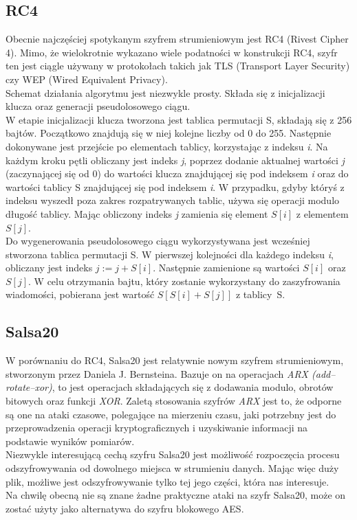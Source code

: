 \subsection{RC4}
Obecnie najczęściej spotykanym szyfrem strumieniowym jest RC4 (Rivest Cipher 4). Mimo, że wielokrotnie wykazano wiele podatności w konstrukcji RC4, szyfr ten jest ciągle używany w protokołach takich jak TLS (Transport Layer Security) czy WEP (Wired Equivalent Privacy). \\
Schemat działania algorytmu jest niezwykle prosty. 
Składa się z inicjalizacji klucza oraz generacji pseudolosowego ciągu. \\
W etapie inicjalizacji klucza tworzona jest tablica permutacji S, składają się z 256 bajtów. 
Początkowo znajdują się w niej kolejne liczby od 0 do 255. 
Następnie dokonywane jest przejście po elementach tablicy, korzystając z indeksu \textit{i}. Na każdym kroku pętli obliczany jest indeks \textit{j}, poprzez dodanie aktualnej wartości \textit{j} (zaczynającej się od 0) do wartości klucza znajdującej się pod indeksem \textit{i} oraz do wartości tablicy S znajdującej się pod indeksem \textit{i}. W przypadku, gdyby któryś z indeksu wyszedł poza zakres rozpatrywanych tablic, używa się operacji modulo długość tablicy. Mając obliczony indeks \textit{j} zamienia się element $S[i]$ z elementem $S[j]$. \\
Do wygenerowania pseudolosowego ciągu wykorzystywana jest wcześniej stworzona tablica permutacji S. W pierwszej kolejności dla każdego indeksu \textit{i}, obliczany jest indeks $j := j + S[i]$. 
Następnie zamienione są wartości $S[i]$ oraz $S[j]$. W celu otrzymania bajtu, który zostanie wykorzystany do zaszyfrowania wiadomości, pobierana jest wartość $S[S[i] + S[j]]$ z tablicy~S.

\subsection{Salsa20}
W porównaniu do RC4, Salsa20 jest relatywnie nowym szyfrem strumieniowym, stworzonym przez Daniela J. Bernsteina. 
Bazuje on na operacjach \textit{ARX (add–rotate–xor)}, to jest operacjach składających się z dodawania modulo, obrotów bitowych oraz funkcji \textit{XOR}. 
Zaletą stosowania szyfrów \textit{ARX} jest to, że odporne są one na ataki czasowe, 
polegające na mierzeniu czasu, jaki potrzebny jest do przeprowadzenia operacji kryptograficznych i uzyskiwanie informacji na podstawie wyników pomiarów. \\
Niezwykle interesującą cechą szyfru Salsa20 jest możliwość rozpoczęcia procesu odszyfrowywania od dowolnego miejsca w strumieniu danych. Mając więc duży plik, możliwe jest odszyfrowywanie tylko tej jego części, która nas interesuje. \\
Na chwilę obecną nie są znane żadne praktyczne ataki na szyfr Salsa20, może on zostać użyty jako alternatywa do szyfru blokowego AES.

